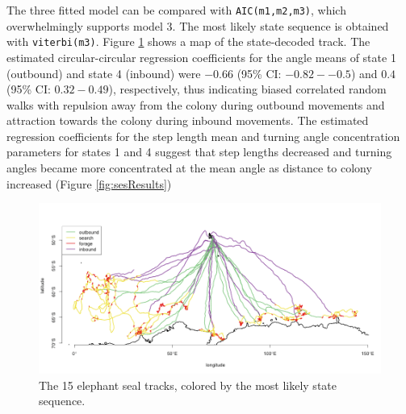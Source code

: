 \documentclass[12pt]{article}\usepackage[]{graphicx}\usepackage[]{xcolor}
\begin{document}
The three fitted model can be compared with \verb|AIC(m1,m2,m3)|, which overwhelmingly supports model 3. The most likely state sequence is obtained with \verb|viterbi(m3)|. Figure \ref{fig:sesTracks} shows a map of the state-decoded track. The estimated circular-circular regression coefficients for the angle means of state 1 (outbound) and state 4 (inbound) were $-0.66$ (95\% CI: $-0.82--0.5$) and $0.4$ (95\% CI: $0.32-0.49$), respectively, thus indicating biased correlated random walks with repulsion away from the colony during outbound movements and attraction towards the colony during inbound movements. The estimated regression coefficients for the step length mean and turning angle concentration parameters for states 1 and 4 suggest that step lengths decreased and turning angles became more concentrated at the mean angle as distance to colony increased (Figure \ref{fig:sesResults})

\begin{figure}[htbp]
  \centering
  \includegraphics[width=\textwidth]{plot_sesResults2.png}
  \caption{The 15 elephant seal tracks, colored by the most likely state sequence.}
  \label{fig:sesTracks}
\end{figure}
\end{document}
